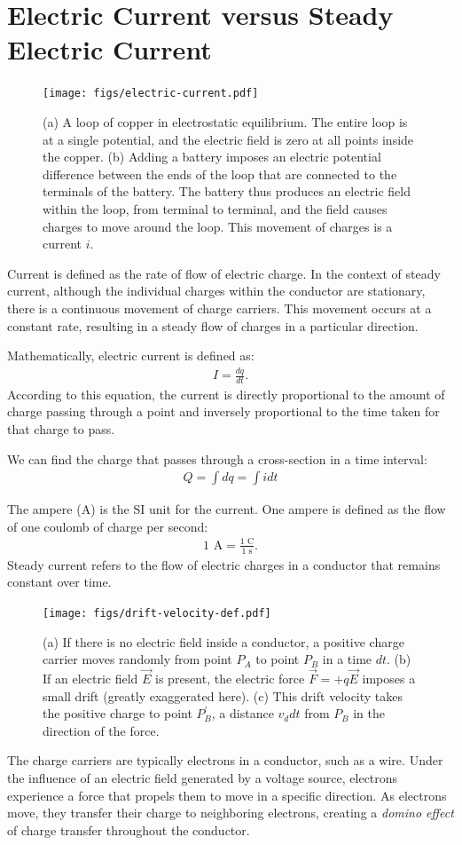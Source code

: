 \documentclass[12pt,b4paper]{article}
\begin{document}
\section{Electric Current versus Steady Electric Current}
\begin{figure}[H]
    \centering
    \texttt{[image: figs/electric-current.pdf]}
    \caption{(a) A loop of copper in electrostatic equilibrium. The entire loop is at a single potential, and the electric field is zero at all points inside the copper. (b) Adding a battery imposes an electric potential difference between the ends of the loop that are connected to the terminals of the battery. The battery thus produces an electric field within the loop, from terminal to terminal, and the field causes charges to move around the loop. This movement of charges is a current $i$.}
    \label{fig:electric-current-def}
\end{figure}
Current is defined as the rate of flow of electric charge. In the context of steady current, although the individual charges within the conductor are stationary, there is a continuous movement of charge carriers. This movement occurs at a constant rate, resulting in a steady flow of charges in a particular direction.

Mathematically, electric current is defined as:
\begin{align}
    I=\frac{dq}{dt}.
\end{align}
According to this equation, the current is directly proportional to the amount of charge passing through a point and inversely proportional to the time taken for that charge to pass.

We can find the charge that passes through a cross-section in a time interval:
\begin{align}
    Q=\int dq=\int idt
\end{align}

The ampere (A) is the SI unit for the current. One ampere is defined as the flow of one coulomb of charge per second:
\begin{align}
     1\text{ A}=\frac{1\text{ C}}{1\text{ s}}.
\end{align}
Steady current refers to the flow of electric charges in a conductor that remains constant over time. 
\begin{figure}[H]
    \centering
    \texttt{[image: figs/drift-velocity-def.pdf]}
    \caption{(a) If there is no electric field inside a conductor, a positive charge carrier moves randomly from point $P_A$ to point $P_B$ in a time $dt$. (b) If an electric field $\vec{E}$ is present, the electric force $\vec{F}=+q\vec{E}$ imposes a small drift (greatly exaggerated here). (c) This drift velocity takes the positive charge to point $P_B^{'}$, a distance $v_ddt$ from $P_B$ in the direction of the force.}
    \label{fig:drift-velocity-def}
\end{figure}
The charge carriers are typically electrons in a conductor, such as a wire. Under the influence of an electric field generated by a voltage source, electrons experience a force that propels them to move in a specific direction. As electrons move, they transfer their charge to neighboring electrons, creating a \textit{domino effect} of charge transfer throughout the conductor.
\end{document}
